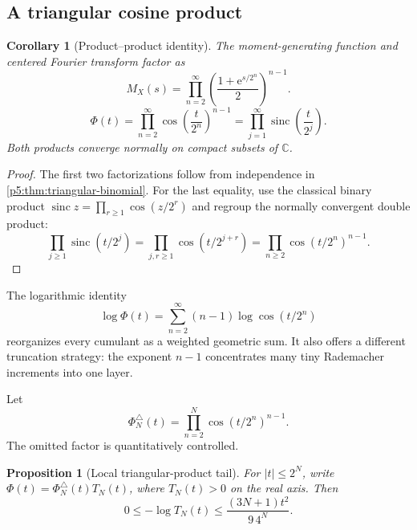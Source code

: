 \documentclass[11pt,oneside]{article}
\newtheorem{proposition}[theorem]{Proposition}
\newtheorem{corollary}[theorem]{Corollary}
\theoremstyle{definition}
\newcommand{\e}{\mathrm e}
\newcommand{\C}{\mathbb C}
\newcommand{\sinc}{\operatorname{sinc}}
\begin{document}
\subsection{A triangular cosine product}

\begin{corollary}[Product--product identity]
\label{p5:cor:triangular-product}
The moment-generating function and centered Fourier transform factor as
\begin{equation}
 M_X(s)=\prod_{n=2}^\infty
   \left(\frac{1+\e^{s/2^n}}{2}\right)^{n-1}.            \label{p5:eq:triangular-mgf}
\end{equation}
\begin{equation}
 \boxed{\displaystyle
 \Phi(t)=\prod_{n=2}^\infty
   \cos\!\left(\frac{t}{2^n}\right)^{n-1}
 =\prod_{j=1}^\infty
   \sinc\!\left(\frac{t}{2^j}\right).}                 \label{p5:eq:triangular-cos-product}
\end{equation}
Both products converge normally on compact subsets of $\C$.
\end{corollary}

\begin{proof}
The first two factorizations follow from independence in
\cref{p5:thm:triangular-binomial}.  For the last equality, use the classical
binary product
$\sinc z=\prod_{r\ge1}\cos(z/2^r)$ and regroup the normally convergent double
product:
\[
 \prod_{j\ge1}\sinc(t/2^j)
 =\prod_{j,r\ge1}\cos(t/2^{j+r})
 =\prod_{n\ge2}\cos(t/2^n)^{n-1}.
\]
\end{proof}

The logarithmic identity
\begin{equation}
 \log\Phi(t)=\sum_{n=2}^\infty(n-1)
              \log\cos(t/2^n)                           \label{p5:eq:triangular-log}
\end{equation}
reorganizes every cumulant as a weighted geometric sum.  It also offers a
different truncation strategy: the exponent $n-1$ concentrates many tiny
Rademacher increments into one layer.

Let
\begin{equation}
 \Phi_N^\triangle(t)=\prod_{n=2}^{N}
 \cos(t/2^n)^{n-1}.                                     \label{p5:eq:triangular-finite-product}
\end{equation}
The omitted factor is quantitatively controlled.

\begin{proposition}[Local triangular-product tail]
\label{p5:prop:triangular-tail}
For $|t|\le2^N$, write $\Phi(t)=\Phi_N^\triangle(t)T_N(t)$, where
$T_N(t)>0$ on the real axis.  Then
\begin{equation}
 0\le-\log T_N(t)
 \le \frac{(3N+1)t^2}{9\,4^N}.                           \label{p5:eq:triangular-tail}
\end{equation}
\end{proposition}
\end{document}
